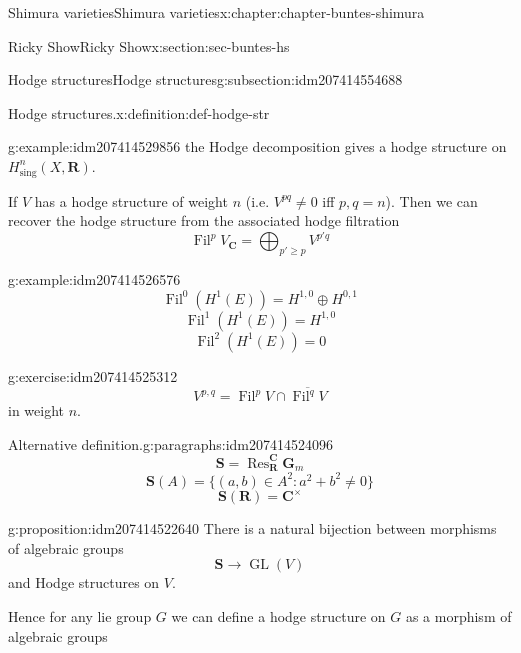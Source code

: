 \documentclass[oneside,10pt,]{book}
\numberwithin{equation}{section}
\newcommand{\RR}{\mathbf{R}}
\newcommand{\CC}{\mathbf{C}}
\DeclareMathOperator{\Fil}{Fil}
\DeclareMathOperator{\Res}{Res}
\DeclareMathOperator{\GL}{GL}
\begin{document}
\begin{chapterptx}{Shimura varieties}{}{Shimura varieties}{}{}{x:chapter:chapter-buntes-shimura}
\begin{sectionptx}{Ricky Show}{}{Ricky Show}{}{}{x:section:sec-buntes-hs}
\begin{subsectionptx}{Hodge structures}{}{Hodge structures}{}{}{g:subsection:idm207414554688}
\begin{definition}{Hodge structures.}{x:definition:def-hodge-str}
\end{definition}
\begin{example}{}{g:example:idm207414529856}%
the Hodge decomposition gives a hodge structure on \(H^n_{\mathrm{sing}}(X, \RR)\).%
\end{example}
If \(V\) has a hodge structure of weight \(n\) (i.e. \(V^{pq} \ne 0\) iff \(p,q = n\)). Then we can recover the hodge structure from the associated hodge filtration%
\begin{equation*}
\Fil^p V_\CC = \bigoplus_{p' \ge p} V^{p' q}
\end{equation*}
%
\begin{example}{}{g:example:idm207414526576}%
%
\begin{equation*}
\Fil^0(H^1(E)) = H^{1,0} \oplus H^{0,1}
\end{equation*}
%
\begin{equation*}
\Fil^1(H^1(E)) = H^{1,0}
\end{equation*}
%
\begin{equation*}
\Fil^2(H^1(E)) = 0
\end{equation*}
%
\end{example}
\begin{inlineexercise}{}{g:exercise:idm207414525312}%
%
\begin{equation*}
V^{p,q} = \Fil^p V \cap \overline {\Fil^q V}
\end{equation*}
in weight \(n\).%
\end{inlineexercise}
\begin{paragraphs}{Alternative definition.}{g:paragraphs:idm207414524096}%
%
\begin{equation*}
\mathbf S = \Res_\RR^\CC \mathbf G_m
\end{equation*}
%
\begin{equation*}
\mathbf S(A) = \{ (a,b) \in A^2 : a^2+  b^2 \ne 0\}
\end{equation*}
%
\begin{equation*}
\mathbf S(\RR) = \CC^\times
\end{equation*}
%
\begin{proposition}{}{}{g:proposition:idm207414522640}%
There is  a natural bijection between morphisms of algebraic groups%
\begin{equation*}
\mathbf S \to \GL(V)
\end{equation*}
and Hodge structures on \(V\).%
\end{proposition}
Hence for any lie group \(G\) we can define a hodge structure on \(G\) as a morphism of algebraic groups%
\begin{equation*}

\end{equation*}
\end{paragraphs}
\end{subsectionptx}
\end{sectionptx}
\end{chapterptx}
\end{document}
